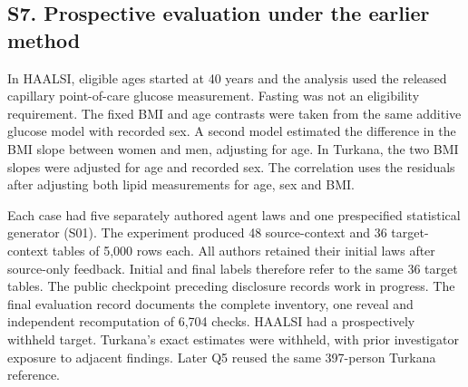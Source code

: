\documentclass[11pt,letterpaper]{article}
\begin{document}
\clearpage

\subsection*{S7. Prospective evaluation under the earlier method}

In HAALSI, eligible ages started at 40 years and the analysis used the released capillary point-of-care glucose measurement. Fasting was not an eligibility requirement. The fixed BMI and age contrasts were taken from the same additive glucose model with recorded sex. A second model estimated the difference in the BMI slope between women and men, adjusting for age. In Turkana, the two BMI slopes were adjusted for age and recorded sex. The correlation uses the residuals after adjusting both lipid measurements for age, sex and BMI.


Each case had five separately authored agent laws and one prespecified statistical generator (S01). The experiment produced 48 source-context and 36 target-context tables of 5,000 rows each. All authors retained their initial laws after source-only feedback. Initial and final labels therefore refer to the same 36 target tables. The public checkpoint preceding disclosure records work in progress. The final evaluation record documents the complete inventory, one reveal and independent recomputation of 6,704 checks. HAALSI had a prospectively withheld target. Turkana's exact estimates were withheld, with prior investigator exposure to adjacent findings. Later Q5 reused the same 397-person Turkana reference.


\FloatBarrier

\begingroup

\small

\renewcommand{\arraystretch}{1.22}
\end{document}
